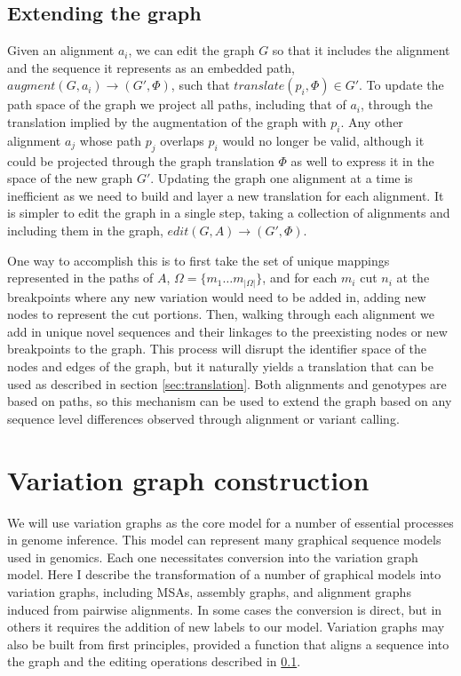 \subsection{Extending the graph}
\label{sec:extending}

Given an alignment $a_i$, we can edit the graph $G$ so that it includes the alignment and the sequence it represents as an embedded path, $augment(G, a_i) \to (G', \Phi)$, such that $translate(p_i, \Phi) \in G'$.
To update the path space of the graph we project all paths, including that of $a_i$, through the translation implied by the augmentation of the graph with $p_i$.
Any other alignment $a_j$ whose path $p_j$ overlaps $p_i$ would no longer be valid, although it could be projected through the graph translation $\Phi$ as well to express it in the space of the new graph $G'$.
Updating the graph one alignment at a time is inefficient as we need to build and layer a new translation for each alignment.
It is simpler to edit the graph in a single step, taking a collection of alignments and including them in the graph, $edit(G, A) \to (G', \Phi)$.

One way to accomplish this is to first take the set of unique mappings represented in the paths of $A$, $\Omega = \{ m_1 \ldots m_{|\Omega|}\}$, and for each $m_i$ cut $n_i$ at the breakpoints where any new variation would need to be added in, adding new nodes to represent the cut portions.
Then, walking through each alignment we add in unique novel sequences and their linkages to the preexisting nodes or new breakpoints to the graph.
This process will disrupt the identifier space of the nodes and edges of the graph, but it naturally yields a translation that can be used as described in section \ref{sec:translation}.
Both alignments and genotypes are based on paths, so this mechanism can be used to extend the graph based on any sequence level differences observed through alignment or variant calling.

\section{Variation graph construction}

We will use variation graphs as the core model for a number of essential processes in genome inference.
This model can represent many graphical sequence models used in genomics.
Each one necessitates conversion into the variation graph model.
Here I describe the transformation of a number of graphical models into variation graphs, including MSAs, assembly graphs, and alignment graphs induced from pairwise alignments.
In some cases the conversion is direct, but in others it requires the addition of new labels to our model.
Variation graphs may also be built from first principles, provided a function that aligns a sequence into the graph and the editing operations described in \ref{sec:extending}.

